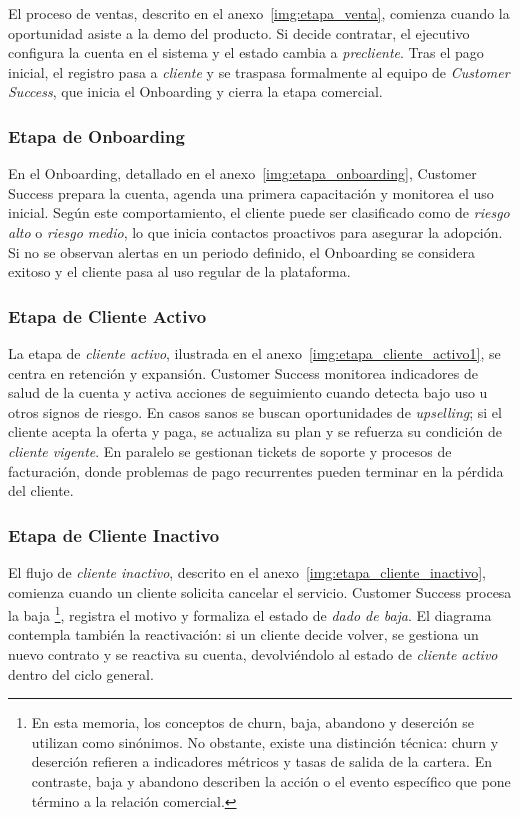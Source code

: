 El proceso de ventas, descrito en el anexo~\ref{img:etapa_venta}, comienza cuando la oportunidad asiste a la demo del producto. Si decide contratar, el ejecutivo configura la cuenta en el sistema y el estado cambia a \textit{precliente}. Tras el pago inicial, el registro pasa a \textit{cliente} y se traspasa formalmente al equipo de \textit{Customer Success}, que inicia el Onboarding y cierra la etapa comercial.

\subsubsection{Etapa de Onboarding}

En el Onboarding, detallado en el anexo~\ref{img:etapa_onboarding}, Customer Success prepara la cuenta, agenda una primera capacitación y monitorea el uso inicial. Según este comportamiento, el cliente puede ser clasificado como de \textit{riesgo alto} o \textit{riesgo medio}, lo que inicia contactos proactivos para asegurar la adopción. Si no se observan alertas en un periodo definido, el Onboarding se considera exitoso y el cliente pasa al uso regular de la plataforma.

\subsubsection{Etapa de Cliente Activo}

La etapa de \textit{cliente activo}, ilustrada en el anexo~\ref{img:etapa_cliente_activo1}, se centra en retención y expansión. Customer Success monitorea indicadores de salud de la cuenta y activa acciones de seguimiento cuando detecta bajo uso u otros signos de riesgo. En casos sanos se buscan oportunidades de \emph{upselling}; si el cliente acepta la oferta y paga, se actualiza su plan y se refuerza su condición de \textit{cliente vigente}. En paralelo se gestionan tickets de soporte y procesos de facturación, donde problemas de pago recurrentes pueden terminar en la pérdida del cliente.

\subsubsection{Etapa de Cliente Inactivo}

El flujo de \textit{cliente inactivo}, descrito en el anexo~\ref{img:etapa_cliente_inactivo}, comienza cuando un cliente solicita cancelar el servicio. Customer Success procesa la baja \footnote{En esta memoria, los conceptos de churn, baja, abandono y deserción se utilizan como sinónimos. No obstante, existe una distinción técnica: churn y deserción refieren a indicadores métricos y tasas de salida de la cartera. En contraste, baja y abandono describen la acción o el evento específico que pone término a la relación comercial.}, registra el motivo y formaliza el estado de \textit{dado de baja}. El diagrama contempla también la reactivación: si un cliente decide volver, se gestiona un nuevo contrato y se reactiva su cuenta, devolviéndolo al estado de \textit{cliente activo} dentro del ciclo general.

